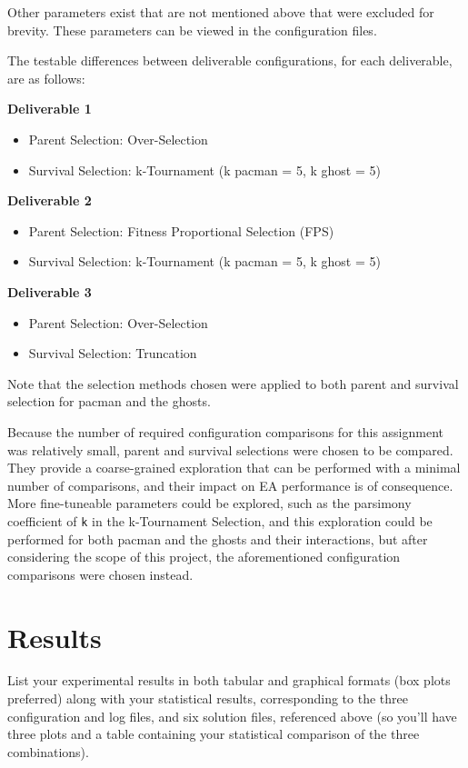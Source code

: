 \documentclass[11pt]{article}
\begin{document}
Other parameters exist that are not mentioned above that were excluded for brevity. These parameters can be 
viewed in the configuration files.

The testable differences between deliverable configurations, for each deliverable, are as follows:

\textbf{Deliverable 1}
\begin{itemize}[leftmargin=.8in]
    \item Parent Selection: Over-Selection
    \item Survival Selection: k-Tournament (k pacman = 5, k ghost = 5)
\end{itemize}

\textbf{Deliverable 2}
\begin{itemize}[leftmargin=.8in]
    \item Parent Selection: Fitness Proportional Selection (FPS)
    \item Survival Selection: k-Tournament (k pacman = 5, k ghost = 5)
\end{itemize}

\textbf{Deliverable 3}
\begin{itemize}[leftmargin=.8in]
    \item Parent Selection: Over-Selection
    \item Survival Selection: Truncation
\end{itemize}

Note that the selection methods chosen were applied to both parent and survival selection for pacman and the ghosts.

Because the number of required configuration comparisons for this assignment was relatively small, parent and
survival selections were chosen to be compared. They provide a coarse-grained exploration that can be
performed with a minimal number of comparisons, and their impact on EA performance is of consequence. More fine-tuneable
parameters could be explored, such as the parsimony coefficient of \texttt{k} in the k-Tournament Selection, and this exploration could be performed for both
pacman and the ghosts and their interactions, but after considering the scope of this project, the aforementioned configuration
comparisons were chosen instead.


\section{Results}
List your experimental results in both tabular and graphical formats (box plots preferred)
along with your statistical results, corresponding to the three configuration and log files, and six
solution files, referenced above (so you’ll have three plots and a table containing your statistical
comparison of the three combinations).
\end{document}
